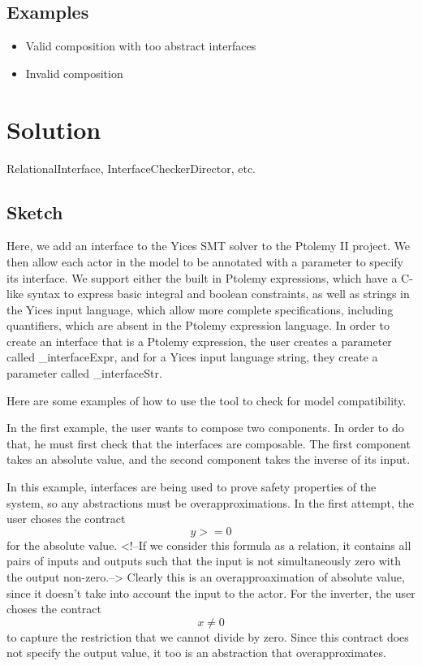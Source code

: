 \documentclass[preprint,11pt,authoryear]{sigplanconf}
\begin{document}
\subsection{Examples}
\begin{itemize}
	\item Valid composition with too abstract interfaces
	\item Invalid composition
\end{itemize}
\section{Solution}
RelationalInterface,
InterfaceCheckerDirector,
etc.

\subsection{Sketch}
Here, we add an interface to the Yices\cite{yices} SMT solver to the Ptolemy II\cite{ptII} project.  We then allow each actor in the model to be annotated with a parameter to specify its interface.  We support either the built in Ptolemy expressions, which have a C-like syntax to express basic integral and boolean constraints, as well as strings in the Yices input language, which allow more complete specifications, including quantifiers, which are absent in the Ptolemy expression language.  In order to create an interface that is a Ptolemy expression, the user creates a parameter called \_interfaceExpr, and for a Yices input language string, they create a parameter called \_interfaceStr.

Here are some examples of how to use the tool to check for model compatibility.

In the first example, the user wants to compose two components.  In order to do that, he must first check that the interfaces are composable.  The first component takes an absolute value, and the second component takes the inverse of its input.

In this example, interfaces are being used to prove safety properties of the system, so any abstractions must be overapproximations.  In the first attempt, the user choses the contract 
\[
y >= 0
\]
for the absolute value.  <!--If we consider this formula as a relation, it contains all pairs of inputs and outputs such that the input is not simultaneously zero with the output non-zero.-->  Clearly this is an overapproaximation of absolute value, since it doesn't take into account the input to the actor.
For the inverter, the user choses the contract
\[
x \ne 0
\]
to capture the restriction that we cannot divide by zero.  Since this contract does not specify the output value, it too is an abstraction that overapproximates.
\end{document}
